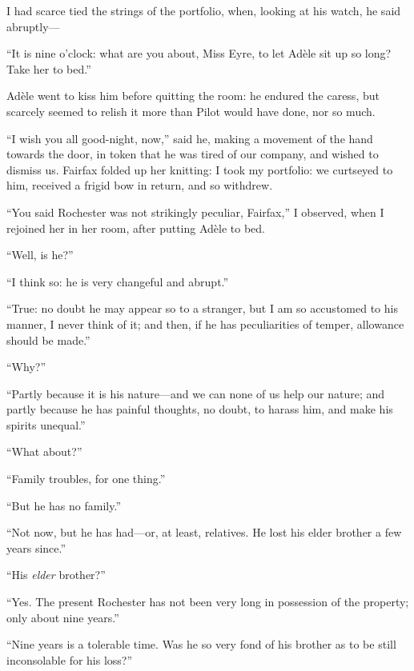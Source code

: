 I had scarce tied the strings of the portfolio, when, looking at his
watch, he said abruptly---

\enquote{It is nine o'clock: what are you about, Miss Eyre, to let Adèle
	sit up so long? Take her to bed.}

Adèle went to kiss him before quitting the room: he endured the caress,
but scarcely seemed to relish it more than Pilot would have done, nor so
much.

\enquote{I wish you all good-night, now,} said he, making a movement of
the hand towards the door, in token that he was tired of our company,
and wished to dismiss us. \Mrs{} Fairfax folded up her knitting: I took
my portfolio: we curtseyed to him, received a frigid bow in return, and
so withdrew.

\enquote{You said \Mr{} Rochester was not strikingly peculiar, \Mrs{}
	Fairfax,} I observed, when I rejoined her in her room, after putting
Adèle to bed.

\enquote{Well, is he?}

\enquote{I think so: he is very changeful and abrupt.}

\enquote{True: no doubt he may appear so to a stranger, but I am so
	accustomed to his manner, I never think of it; and then, if he has
	peculiarities of temper, allowance should be made.}

\enquote{Why?}

\enquote{Partly because it is his nature---and we can none of us help
	our nature; and partly because he has painful thoughts, no doubt, to
	harass him, and make his spirits unequal.}

\enquote{What about?}

\enquote{Family troubles, for one thing.}

\enquote{But he has no family.}

\enquote{Not now, but he has had---or, at least, relatives. He lost his
	elder brother a few years since.}

\enquote{His \emph{elder} brother?}

\enquote{Yes. The present \Mr{} Rochester has not been very long in
	possession of the property; only about nine years.}

\enquote{Nine years is a tolerable time. Was he so very fond of his
	brother as to be still inconsolable for his loss?}

